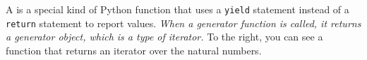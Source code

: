 A  is a special kind of Python function that uses a
\lstinline$yield$ statement instead of a \lstinline$return$ statement to report
values. \emph{When a generator function is called, it returns a generator object, 
which is a type of iterator.} To the right, you can see a function that returns an 
iterator over the natural numbers.
